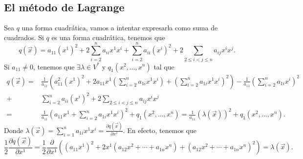 \subsection*{El método de Lagrange}
Sea $\displaystyle q$ una forma cuadrática, vamos a intentar expresarla como suma de cuadrados. 
Si $\displaystyle q $ es una forma cuadrática, tenemos que 
\[ q\left(\vec{x}\right) = a_{11}\left(x^{1}\right)^{2} + 2 \sum^{n}_{i = 2}a_{ii}x^{1}x^{i} + \sum^{n}_{i=2}a_{ii}\left(x^{i}\right)^{2} + 2 \sum^{}_{2 \leq i < j \leq n}a_{ij}x^{i}x^{j} .\]
Si $\displaystyle a_{11} \neq 0 $, tenemos que $\displaystyle \exists \lambda \in V^{*} $ y $\displaystyle q_{1}\left(x^{2}, \ldots, x^{n}\right) $ tal que 
\[
\begin{split}
	q\left(\vec{x}\right) = 
	 & \frac{1}{a_{11}}\left(a^{2}_{11}\left(x^{1}\right)^{2} + 2a_{11}x^{1}\left(\sum^{n}_{i=2}a_{1i}x^{1}x^{i}\right)+\left(\sum^{n}_{i=2}a_{1i}x^{1}x^{i}\right)^{2}\right) -\frac{1}{a_{11}}\left(\sum^{n}_{i=2}a_{1i}x^{i}\right)^{2}\\
	+ &  \sum^{n}_{i=2}a_{ii}\left(x^{i}\right)^{2}+2\sum^{}_{2\leq i < j \leq n}a_{ij}x^{i}x^{j}\\
	= & \frac{1}{a_{11}}\left(a_{11}x^{1}+\sum^{n}_{i=2}a_{1i}x^{1}x^{i}\right)^{2}+q_{1}\left(x^{2}, \ldots, x^{n}\right) 
	=  \frac{1}{a_{11}}\left(\lambda\left(\vec{x}\right)\right)^{2}+q_{1}\left(x^{2}, \ldots, x^{n}\right).
\end{split}
\]
Donde $\displaystyle \lambda \left(\vec{x}\right) = \sum^{n}_{i=1}a_{1i}x^{1}x^{i} = \frac{\partial q\left(\vec{x}\right)}{\partial x^{1}} $.
En efecto, tenemos que 
\[ \frac{1}{2} \frac{\partial q\left(\vec{x}\right)}{\partial x^{1}} = \frac{1}{2} \frac{ \partial}{\partial x^{1}} \left( \left(a_{11}x^{1}\right)^{2} + 2x^{1}\left(a_{12}x^{2}+ \cdots + a_{1n}x^{n}\right)+\left(a_{12}x^{2} + \cdots + a_{1n}x^{n}\right)^{2}\right) = \lambda\left(\vec{x}\right) .\]
